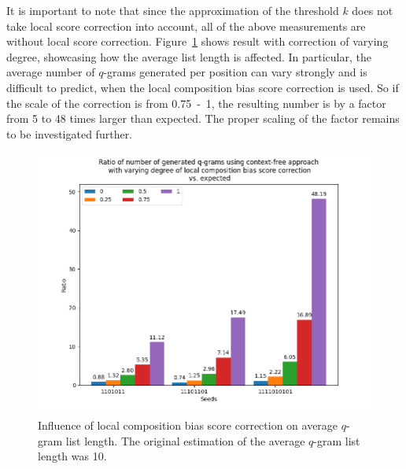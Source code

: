 \documentclass[twoside,a4paper,bsc]{master}
\newcommand{\Qgram}[1]{\(#1\)-gram}
\begin{document}
It is important to note that since the approximation of the threshold \(k\)
does not take local score correction into account, all of the above
measurements are without local score correction.
Figure~\ref{fig:compbias} shows result with correction of varying
degree, showcasing how the average list length is affected. In particular,
the average number of \Qgram{q}s generated per position can vary strongly
and is difficult to predict, when the
local composition bias score correction is used. So if the scale
of the correction is from 0.75~-~1, the resulting number is by a factor from
5 to 48 times larger than expected. The proper scaling of the
factor remains to be investigated further.
\begin{figure}
\centering
\includegraphics[scale=0.6]{graphics/comp_bias.png}
\caption{Influence of local composition bias score correction on average
\Qgram{q} list length. The original estimation of the average
\Qgram{q} list length was 10.}
\label{fig:compbias}
\end{figure}
\end{document}
